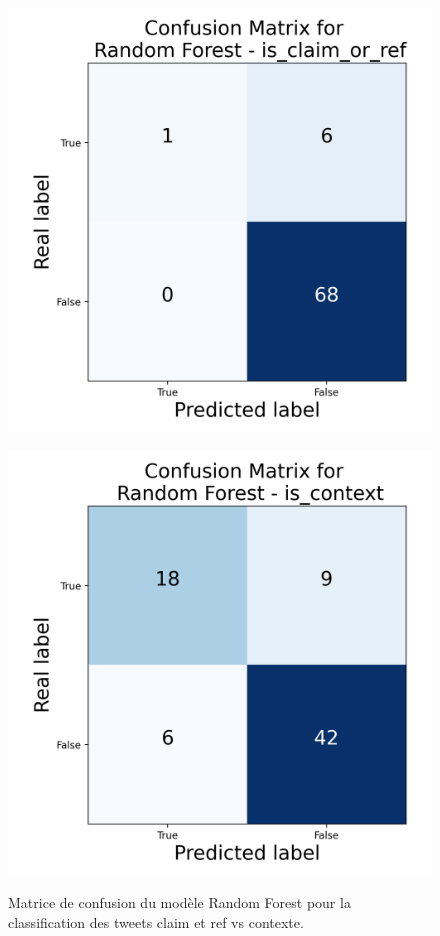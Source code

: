 \begin{figure}[h]
    \centering
    \begin{minipage}[b]{0.49\textwidth}
        \centering
        \includegraphics[width=\textwidth]{images/confusion_2.json-Random Forest_is_claim_or_ref_confusion_matrix}
        \label{fig:confusion_2_1}
    \end{minipage}
    \hfill
    \begin{minipage}[b]{0.49\textwidth}
        \centering
        \includegraphics[width=\textwidth]{images/confusion_2.json-Random Forest_is_context_confusion_matrix}
        \label{fig:confusion_2_2}
    \end{minipage}
    \caption{Matrice de confusion du modèle Random Forest pour la classification des tweets claim et ref vs contexte.}
    \label{fig:confusion_2}
\end{figure}

